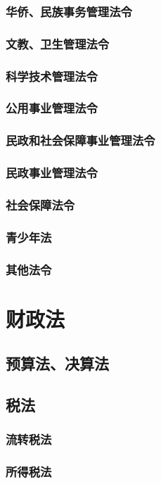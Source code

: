 \documentclass[UTF8]{../ApplicationUniverse}
\begin{document}
        \subsubsection{华侨、民族事务管理法令}
        \subsubsection{文教、卫生管理法令}
        \subsubsection{科学技术管理法令}
        \subsubsection{公用事业管理法令}
        \subsubsection{民政和社会保障事业管理法令}
        \subsubsection{民政事业管理法令}
        \subsubsection{社会保障法令}
        \subsubsection{青少年法}
        \subsubsection{其他法令}


\section{财政法}
    \subsection{预算法、决算法}
    \subsection{税法}
        \subsubsection{流转税法}
        \subsubsection{所得税法}
\end{document}

